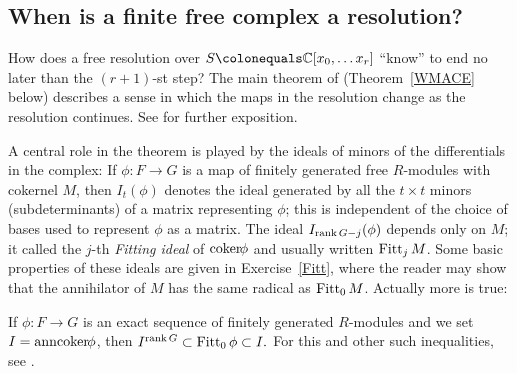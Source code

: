 
\subsection*{When is a finite free complex a resolution?}
How does a free resolution over $S \colonequals  \CC[x_0, \dots x_r]$
``know'' to end no later than the $(r+1)$-st step?
The main theorem of \cite{WMACE} (Theorem~\ref{WMACE} below)
describes a sense in which the maps in the resolution
change as the resolution continues. See \cite[Theorem 20.9]{Eisenbud1995}
for further exposition.

A central role in the theorem is played by the ideals of minors of the
differentials in the complex: If $\phi: F\to G$ is a map of finitely
generated free $R$-modules with cokernel $M$, then
$I_t(\phi)$ 
%
denotes the ideal generated by all the $t\times t$ minors
(subdeterminants) of a matrix representing $\phi$; this is independent
of the choice of bases used to represent $\phi$ as a matrix.
The ideal $I_{\operatorname{rank} G -j}(\phi)$ depends only on $M$; it called the
$j$-th \emph{Fitting ideal} of $\coker \phi$  and
%
%
usually written $\operatorname{Fitt}_{j} M$. Some basic properties of these ideals are
given in Exercise~\ref{Fitt}, where the reader may show that the
annihilator of $M$ has the
same radical as $\operatorname{Fitt}_{0} M$. Actually more is true:

\begin{fact}
If $\phi: F\to G$ is an exact sequence of finitely generated
$R$-modules and we set $I = \ann\coker \phi$, then
$
I^{\operatorname{rank} G}\subset \operatorname{Fitt}_{0}\phi \subset
I.
$
For this and other such inequalities, see \cite{MR476736}.
\end{fact}

